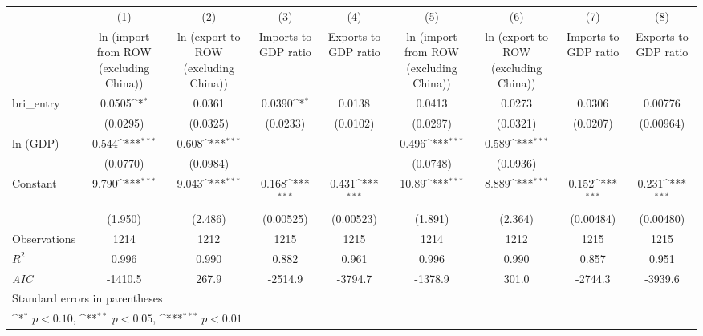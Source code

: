 {
\def\sym#1{\ifmmode^{#1}\else\(^{#1}\)\fi}
\begin{tabular}{l*{8}{c}}
\hline\hline
                    &\multicolumn{1}{c}{(1)}&\multicolumn{1}{c}{(2)}&\multicolumn{1}{c}{(3)}&\multicolumn{1}{c}{(4)}&\multicolumn{1}{c}{(5)}&\multicolumn{1}{c}{(6)}&\multicolumn{1}{c}{(7)}&\multicolumn{1}{c}{(8)}\\
                    &\multicolumn{1}{c}{ln (import from ROW (excluding China))}&\multicolumn{1}{c}{ln (export to ROW (excluding China))}&\multicolumn{1}{c}{Imports to GDP ratio}&\multicolumn{1}{c}{Exports to GDP ratio}&\multicolumn{1}{c}{ln (import from ROW (excluding China))}&\multicolumn{1}{c}{ln (export to ROW (excluding China))}&\multicolumn{1}{c}{Imports to GDP ratio}&\multicolumn{1}{c}{Exports to GDP ratio}\\
\hline
bri\_entry           &      0.0505\sym{*}  &      0.0361         &      0.0390\sym{*}  &      0.0138         &      0.0413         &      0.0273         &      0.0306         &     0.00776         \\
                    &    (0.0295)         &    (0.0325)         &    (0.0233)         &    (0.0102)         &    (0.0297)         &    (0.0321)         &    (0.0207)         &   (0.00964)         \\
[1em]
ln (GDP)            &       0.544\sym{***}&       0.608\sym{***}&                     &                     &       0.496\sym{***}&       0.589\sym{***}&                     &                     \\
                    &    (0.0770)         &    (0.0984)         &                     &                     &    (0.0748)         &    (0.0936)         &                     &                     \\
[1em]
Constant            &       9.790\sym{***}&       9.043\sym{***}&       0.168\sym{***}&       0.431\sym{***}&       10.89\sym{***}&       8.889\sym{***}&       0.152\sym{***}&       0.231\sym{***}\\
                    &     (1.950)         &     (2.486)         &   (0.00525)         &   (0.00523)         &     (1.891)         &     (2.364)         &   (0.00484)         &   (0.00480)         \\
\hline
Observations        &        1214         &        1212         &        1215         &        1215         &        1214         &        1212         &        1215         &        1215         \\
\(R^{2}\)           &       0.996         &       0.990         &       0.882         &       0.961         &       0.996         &       0.990         &       0.857         &       0.951         \\
\textit{AIC}        &     -1410.5         &       267.9         &     -2514.9         &     -3794.7         &     -1378.9         &       301.0         &     -2744.3         &     -3939.6         \\
\hline\hline
\multicolumn{9}{l}{\footnotesize Standard errors in parentheses}\\
\multicolumn{9}{l}{\footnotesize \sym{*} \(p<0.10\), \sym{**} \(p<0.05\), \sym{***} \(p<0.01\)}\\
\end{tabular}
}
